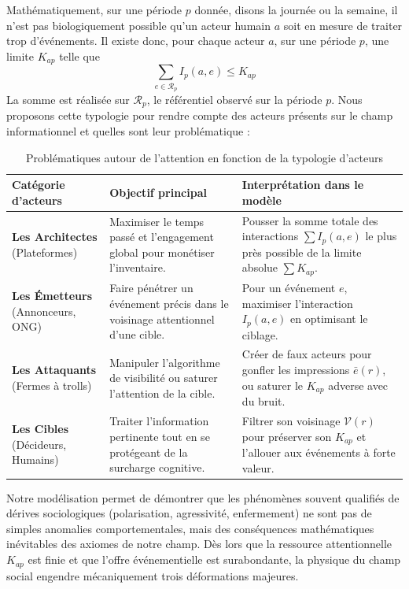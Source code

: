 \documentclass[11pt]{article}
\begin{document}
		Mathématiquement, sur une période $p$ donnée, disons la journée ou la semaine, il n'est pas biologiquement possible qu'un acteur humain $a$ soit en mesure de traiter trop d'événements. Il existe donc, pour chaque acteur $a$, sur une période $p$, une limite $K_{ap}$ telle que $$\sum_{e \in \mathcal{R}_p} I_p(a,e) \le K_{ap}$$ La somme est réalisée sur $\mathcal{R}_p$, le référentiel observé sur la période $p$. Nous proposons cette typologie pour rendre compte des acteurs présents sur le champ informationnel et quelles sont leur problématique : 
		
		\begin{table}[H]
			\centering
			\begin{tabular}{|p{3cm}|p{4.5cm}|p{4.5cm}|}
				\hline 
				\textbf{Catégorie d'acteurs} & \textbf{Objectif principal} & \textbf{Interprétation dans le modèle} \\
				\hline 
				\textbf{Les Architectes} \newline (Plateformes) & Maximiser le temps passé et l'engagement global pour monétiser l'inventaire. & Pousser la somme totale des interactions $\sum I_p(a,e)$ le plus près possible de la limite absolue $\sum K_{ap}$. \\
				\hline 
				\textbf{Les Émetteurs} \newline (Annonceurs, ONG) & Faire pénétrer un événement précis dans le voisinage attentionnel d'une cible. & Pour un événement $e$, maximiser l'interaction $I_p(a,e)$ en optimisant le ciblage. \\
				\hline 
				\textbf{Les Attaquants} \newline (Fermes à trolls) & Manipuler l'algorithme de visibilité ou saturer l'attention de la cible. & Créer de faux acteurs pour gonfler les impressions $\bar{e}(r)$, ou saturer le $K_{ap}$ adverse avec du bruit. \\
				\hline 
				\textbf{Les Cibles} \newline (Décideurs, Humains) & Traiter l'information pertinente tout en se protégeant de la surcharge cognitive. & Filtrer son voisinage $\mathcal{V}(r)$ pour préserver son $K_{ap}$ et l'allouer aux événements à forte valeur. \\
				\hline 
			\end{tabular}
			\caption{Problématiques autour de l'attention en fonction de la typologie d'acteurs}
		\end{table}
		
		
		Notre modélisation permet de démontrer que les phénomènes souvent qualifiés de dérives sociologiques (polarisation, agressivité, enfermement) ne sont pas de simples anomalies comportementales, mais des conséquences mathématiques inévitables des axiomes de notre champ. Dès lors que la ressource attentionnelle $K_{ap}$ est finie et que l'offre événementielle est surabondante, la physique du champ social engendre mécaniquement trois déformations majeures.
		
\end{document}
